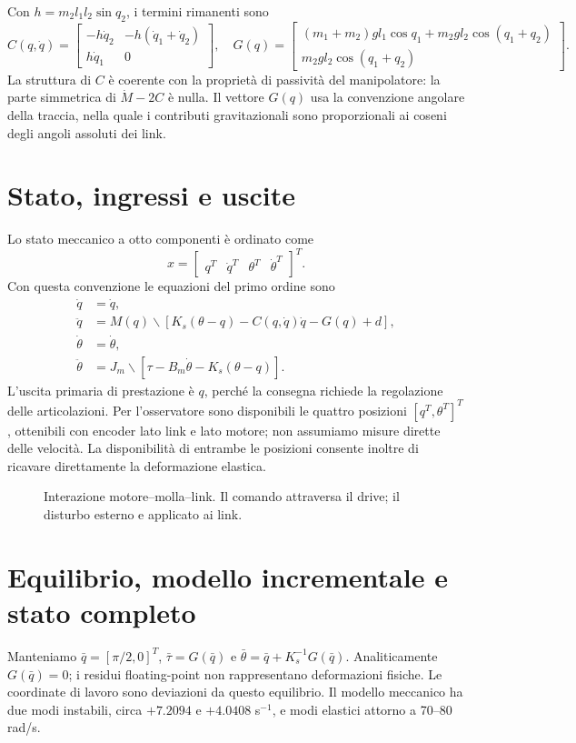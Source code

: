 \documentclass[11pt,a4paper,oneside]{report}
\newcommand{\schema}[2]{\begin{figure}[htbp]\centering\resizebox{.95\linewidth}{!}{}\caption{#2}\end{figure}}
\begin{document}
Con $h=m_2l_1l_2\sin q_2$, i termini rimanenti sono
\[
C(q,\dot q)=\begin{bmatrix}-h\dot q_2&-h(\dot q_1+\dot q_2)\\h\dot q_1&0\end{bmatrix},\quad
G(q)=\begin{bmatrix}(m_1+m_2)gl_1\cos q_1+m_2gl_2\cos(q_1+q_2)\\m_2gl_2\cos(q_1+q_2)\end{bmatrix}.
\]
La struttura di $C$ è coerente con la proprietà di passività del manipolatore: la parte simmetrica di $\dot M-2C$ è nulla. Il vettore $G(q)$ usa la convenzione angolare della traccia, nella quale i contributi gravitazionali sono proporzionali ai coseni degli angoli assoluti dei link.

\section{Stato, ingressi e uscite}
Lo stato meccanico a otto componenti è ordinato come
\[
x=\begin{bmatrix}q^T&\dot q^T&\theta^T&\dot\theta^T\end{bmatrix}^T.
\]
Con questa convenzione le equazioni del primo ordine sono
\begin{align}
\dot q&=\dot q,\\
\ddot q&=M(q)\backslash\left[K_s(\theta-q)-C(q,\dot q)\dot q-G(q)+d\right],\\
\dot\theta&=\dot\theta,\\
\ddot\theta&=J_m\backslash\left[\tau-B_m\dot\theta-K_s(\theta-q)\right].
\end{align}
L'uscita primaria di prestazione è $q$, perché la consegna richiede la regolazione delle articolazioni. Per l'osservatore sono disponibili le quattro posizioni $[q^T,\theta^T]^T$, ottenibili con encoder lato link e lato motore; non assumiamo misure dirette delle velocità. La disponibilità di entrambe le posizioni consente inoltre di ricavare direttamente la deformazione elastica.


\schema{sea}{Interazione motore--molla--link. Il comando attraversa il drive; il disturbo esterno e applicato ai link.}
\section{Equilibrio, modello incrementale e stato completo}
Manteniamo $\bar q=[\pi/2,0]^T$, $\bar\tau=G(\bar q)$ e
$\bar\theta=\bar q+K_s^{-1}G(\bar q)$. Analiticamente $G(\bar q)=0$;
i residui floating-point non rappresentano deformazioni fisiche.
Le coordinate di lavoro sono deviazioni da questo equilibrio.
Il modello meccanico ha due modi instabili, circa $+7.2094$ e $+4.0408$
s$^{-1}$, e modi elastici attorno a 70--80 rad/s.
\end{document}
